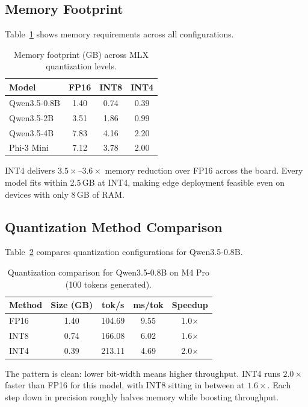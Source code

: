 \documentclass[journal]{IEEEtran}
\begin{document}
\subsection{Memory Footprint}

Table~\ref{tab:memory} shows memory requirements across all configurations.

\begin{table}[htbp]
\centering
\caption{Memory footprint (GB) across MLX quantization levels.}
\label{tab:memory}
\begin{tabular}{l|ccc}
\toprule
\textbf{Model} & \textbf{FP16} & \textbf{INT8} & \textbf{INT4} \\
\midrule
Qwen3.5-0.8B & 1.40 & 0.74 & 0.39 \\
Qwen3.5-2B & 3.51 & 1.86 & 0.99 \\
Qwen3.5-4B & 7.83 & 4.16 & 2.20 \\
Phi-3 Mini & 7.12 & 3.78 & 2.00 \\
\bottomrule
\end{tabular}
\end{table}

INT4 delivers $3.5\times$--$3.6\times$ memory reduction over FP16 across the board. Every model fits within 2.5\,GB at INT4, making edge deployment feasible even on devices with only 8\,GB of RAM.

\subsection{Quantization Method Comparison}

Table~\ref{tab:quant_comparison} compares quantization configurations for Qwen3.5-0.8B.

\begin{table}[htbp]
\centering
\caption{Quantization comparison for Qwen3.5-0.8B on M4 Pro (100 tokens generated).}
\label{tab:quant_comparison}
\begin{tabular}{l|cccc}
\toprule
\textbf{Method} & \textbf{Size (GB)} & \textbf{tok/s} & \textbf{ms/tok} & \textbf{Speedup} \\
\midrule
FP16 & 1.40 & 104.69 & 9.55 & 1.0$\times$ \\
INT8 & 0.74 & 166.08 & 6.02 & 1.6$\times$ \\
INT4 & 0.39 & 213.11 & 4.69 & 2.0$\times$ \\
\bottomrule
\end{tabular}
\end{table}

The pattern is clean: lower bit-width means higher throughput. INT4 runs $2.0\times$ faster than FP16 for this model, with INT8 sitting in between at $1.6\times$. Each step down in precision roughly halves memory while boosting throughput.
\end{document}
